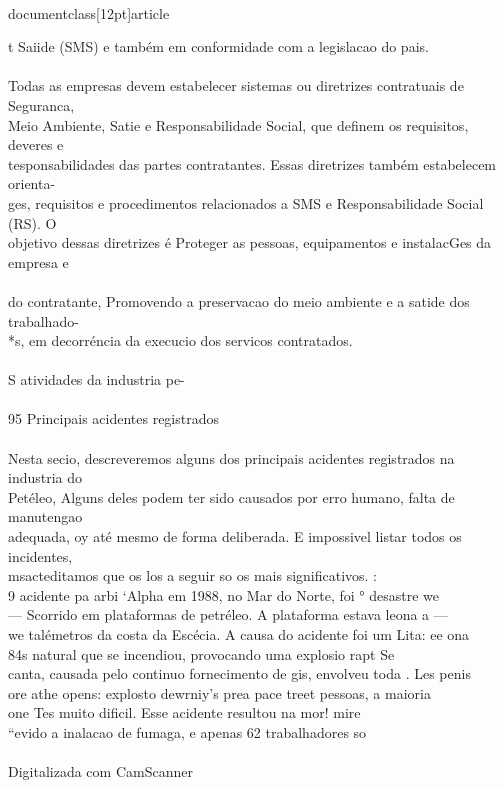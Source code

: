 \\documentclass[12pt]{article}
\begin{document}
{{{{{t Saiide (SMS) e também em conformidade com a legislacao do pais.\\
\\
Todas as empresas devem estabelecer sistemas ou diretrizes contratuais de Seguranca,\\
Meio Ambiente, Satie e Responsabilidade Social, que definem os requisitos, deveres e\\
tesponsabilidades das partes contratantes. Essas diretrizes também estabelecem orienta-\\
ges, requisitos e procedimentos relacionados a SMS e Responsabilidade Social (RS). O\\
objetivo dessas diretrizes é Proteger as pessoas, equipamentos e instalacGes da empresa e\\
\\
do contratante, Promovendo a preservacao do meio ambiente e a satide dos trabalhado-\\
*s, em decorréncia da execucio dos servicos contratados.\\
\\
S atividades da industria pe-\\
\\
95 Principais acidentes registrados\\
\\
Nesta secio, descreveremos alguns dos principais acidentes registrados na industria do\\
Petéleo, Alguns deles podem ter sido causados por erro humano, falta de manutengao\\
adequada, oy até mesmo de forma deliberada. E impossivel listar todos os incidentes,\\
msacteditamos que os los a seguir so os mais significativos. :\\
9 acidente pa arbi ‘Alpha em 1988, no Mar do Norte, foi ° desastre we\\
— Scorrido em plataformas de petréleo. A plataforma estava leona a —\\
we talémetros da costa da Escécia. A causa do acidente foi um Lita: ee ona\\
84s natural que se incendiou, provocando uma explosio rapt Se\\
canta, causada pelo continuo fornecimento de gis, envolveu toda . Les penis\\
ore athe opens: explosto dewrniy's prea pace treet pessoas, a maioria\\
one Tes muito dificil. Esse acidente resultou na mor! mire\\
“evido a inalacao de fumaga, e apenas 62 trabalhadores so\\
\\
Digitalizada com CamScanner\\

}}}}}
\end{document}

